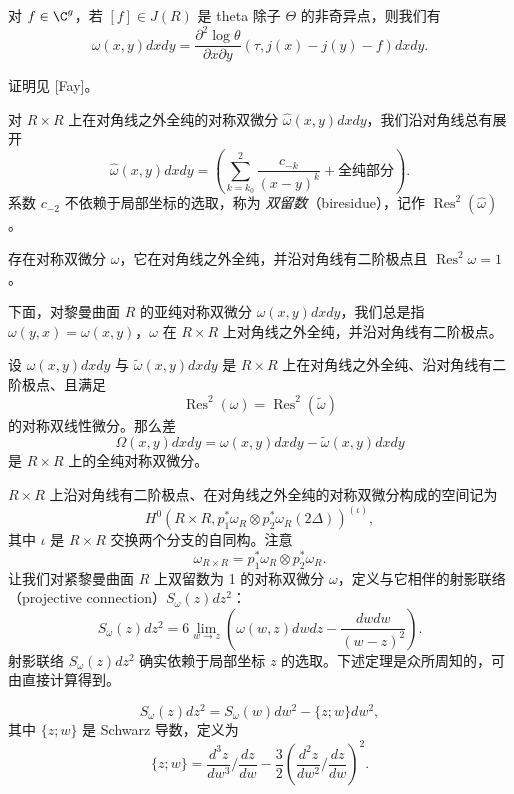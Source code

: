 \begin{proposition}[1.12]
对 $f\in\C^g$，若 $[f]\in J(R)$ 是 theta 除子 $\Theta$ 的非奇异点，则我们有
\[
  \omega(x,y)dxdy=\frac{\partial^2\log\theta}{\partial x\partial y}(\tau,j(x)-j(y)-f)dxdy.
\]
\end{proposition}
证明见 [Fay]。

对 $R\times R$ 上在对角线之外全纯的对称双微分 $\hat\omega(x,y)dxdy$，我们沿对角线总有展开
\[
  \hat\omega(x,y)dxdy=\left(\sum_{k=k_0}^{2}\frac{c_{-k}}{(x-y)^k}+\text{全纯部分}\right).
\]
系数 $c_{-2}$ 不依赖于局部坐标的选取，称为 \emph{双留数}（biresidue），记作 $\operatorname{Res}^2(\hat\omega)$。

\begin{corollary}[1.13]
存在对称双微分 $\omega$，它在对角线之外全纯，并沿对角线有二阶极点且 $\operatorname{Res}^2\omega=1$。
\end{corollary}

下面，对黎曼曲面 $R$ 的亚纯对称双微分 $\omega(x,y)dxdy$，我们总是指 $\omega(y,x)=\omega(x,y)$，$\omega$ 在 $R\times R$ 上对角线之外全纯，并沿对角线有二阶极点。

\begin{lemma}[1.14]
设 $\omega(x,y)dxdy$ 与 $\tilde\omega(x,y)dxdy$ 是 $R\times R$ 上在对角线之外全纯、沿对角线有二阶极点、且满足
\[
  \operatorname{Res}^2(\omega)=\operatorname{Res}^2(\tilde\omega)
\]
的对称双线性微分。那么差
\[
  \Omega(x,y)dxdy=\omega(x,y)dxdy-\tilde\omega(x,y)dxdy
\]
是 $R\times R$ 上的全纯对称双微分。
\end{lemma}

$R\times R$ 上沿对角线有二阶极点、在对角线之外全纯的对称双微分构成的空间记为
\[
  H^0(R\times R,p_1^*\omega_R\otimes p_2^*\omega_R(2\Delta))^{(\iota)},
\]
其中 $\iota$ 是 $R\times R$ 交换两个分支的自同构。注意
\[
  \omega_{R\times R}=p_1^*\omega_R\otimes p_2^*\omega_R .
\]
让我们对紧黎曼曲面 $R$ 上双留数为 1 的对称双微分 $\omega$，定义与它相伴的射影联络（projective connection）$S_\omega(z)dz^2$：
\begin{equation}
  S_\omega(z)dz^2=6\lim_{w\to z}\left(\omega(w,z)dwdz-\frac{dwdw}{(w-z)^2}\right). \tag{1.41}
\end{equation}
射影联络 $S_\omega(z)dz^2$ 确实依赖于局部坐标 $z$ 的选取。下述定理是众所周知的，可由直接计算得到。

\begin{theorem}[1.15]
\[
  S_\omega(z)dz^2=S_\omega(w)dw^2-\{z;w\}dw^2,
\]
其中 $\{z;w\}$ 是 Schwarz 导数，定义为
\[
  \{z;w\}=\frac{d^3z}{dw^3}\Big/\frac{dz}{dw}
  -\frac{3}{2}\left(\frac{d^2z}{dw^2}\Big/\frac{dz}{dw}\right)^2 .
\]
\end{theorem}

